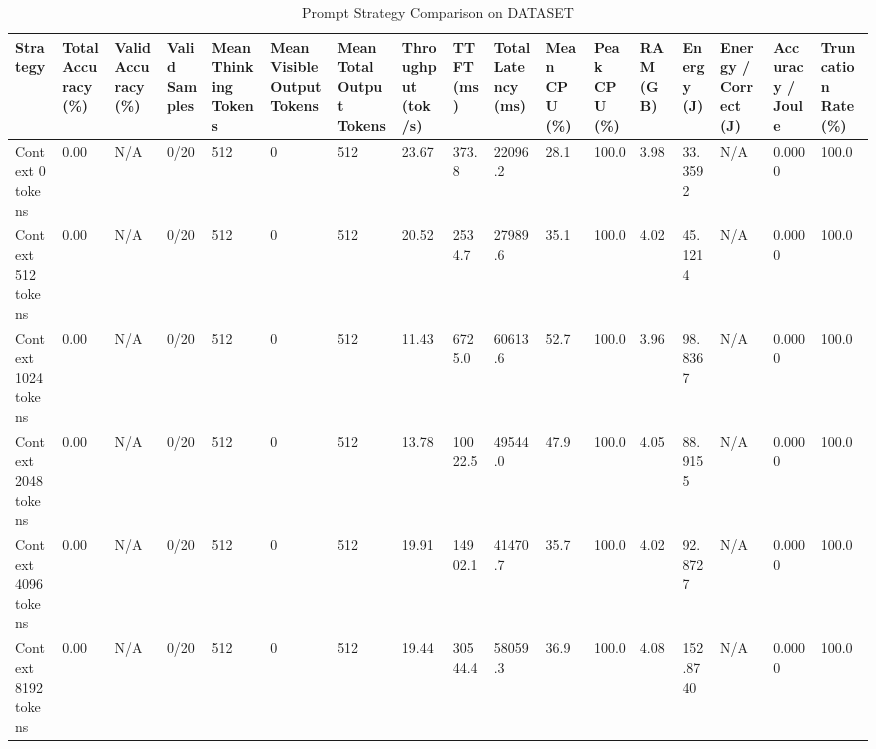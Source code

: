 \begin{table}
\caption{Prompt Strategy Comparison on DATASET}
\label{tab:strategy_comparison}
\begin{tabular}{lllllllllllllllll}
\toprule
Strategy & Total Accuracy (\%) & Valid Accuracy (\%) & Valid Samples & Mean Thinking Tokens & Mean Visible Output Tokens & Mean Total Output Tokens & Throughput (tok/s) & TTFT (ms) & Total Latency (ms) & Mean CPU (\%) & Peak CPU (\%) & RAM (GB) & Energy (J) & Energy / Correct (J) & Accuracy / Joule & Truncation Rate (\%) \\
\midrule
Context 0 tokens & 0.00 & N/A & 0/20 & 512 & 0 & 512 & 23.67 & 373.8 & 22096.2 & 28.1 & 100.0 & 3.98 & 33.3592 & N/A & 0.0000 & 100.0 \\
Context 512 tokens & 0.00 & N/A & 0/20 & 512 & 0 & 512 & 20.52 & 2534.7 & 27989.6 & 35.1 & 100.0 & 4.02 & 45.1214 & N/A & 0.0000 & 100.0 \\
Context 1024 tokens & 0.00 & N/A & 0/20 & 512 & 0 & 512 & 11.43 & 6725.0 & 60613.6 & 52.7 & 100.0 & 3.96 & 98.8367 & N/A & 0.0000 & 100.0 \\
Context 2048 tokens & 0.00 & N/A & 0/20 & 512 & 0 & 512 & 13.78 & 10022.5 & 49544.0 & 47.9 & 100.0 & 4.05 & 88.9155 & N/A & 0.0000 & 100.0 \\
Context 4096 tokens & 0.00 & N/A & 0/20 & 512 & 0 & 512 & 19.91 & 14902.1 & 41470.7 & 35.7 & 100.0 & 4.02 & 92.8727 & N/A & 0.0000 & 100.0 \\
Context 8192 tokens & 0.00 & N/A & 0/20 & 512 & 0 & 512 & 19.44 & 30544.4 & 58059.3 & 36.9 & 100.0 & 4.08 & 152.8740 & N/A & 0.0000 & 100.0 \\
\bottomrule
\end{tabular}
\end{table}

